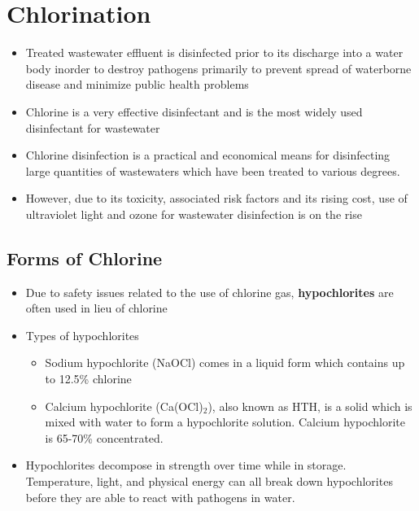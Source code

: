 
\chapter{Chlorination}


\begin{itemize}
\item Treated wastewater effluent is disinfected prior to its discharge into a water body inorder to destroy pathogens primarily to prevent spread of waterborne disease and minimize public health problems
\item Chlorine is a very effective disinfectant and is the most widely used disinfectant for wastewater 
\item Chlorine disinfection is a practical and economical means for disinfecting large quantities of wastewaters which have been treated to various degrees. 
\item However, due to its toxicity, associated risk factors and its rising cost, use of ultraviolet light and ozone for wastewater disinfection is on the rise
\end{itemize}


\section{Forms of Chlorine}

\begin{itemize}
	\item Due to safety issues related to the use of chlorine gas, 			\textbf{hypochlorites} are often used in lieu of chlorine
	\item Types of hypochlorites
	\begin{itemize}
	\item Sodium hypochlorite (NaOCl) comes in a liquid form which contains up to 12.5\% chlorine
	\item Calcium hypochlorite (Ca(OCl)$_2$), also known as HTH, is a solid which is mixed with water to form a hypochlorite solution. Calcium hypochlorite is 65-70\% concentrated.
	\end{itemize}
	\item Hypochlorites decompose in strength over time while in storage. Temperature, light, and physical energy can all break down hypochlorites before they are able to react with pathogens in water. 

\end{itemize} 

